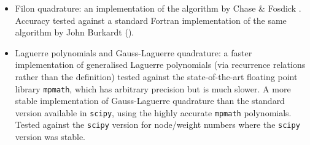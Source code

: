 \documentclass{article}
\newcommand{\1}{\mathbf{1}} %
\begin{document}
\begin{itemize}
  \item Filon quadrature: an implementation of the algorithm by Chase \& Fosdick
    \cite{chase1969algorithm}. Accuracy tested against a standard Fortran implementation
    of the same algorithm by John Burkardt (\cite{burkardt2014filon}).
  \item Laguerre polynomials and Gauss-Laguerre quadrature: a faster implementation
    of generalised Laguerre polynomials (via recurrence relations rather than the definition)
    tested against the state-of-the-art floating point library \texttt{mpmath}, which has
    arbitrary precision but is much slower.
    A more stable implementation of Gauss-Laguerre quadrature
    than the standard version available in \texttt{scipy}, 
    using the highly accurate \texttt{mpmath} polynomials. Tested against the \texttt{scipy}
    version for node/weight numbers where the \texttt{scipy} version was stable.
\end{itemize}

\clearpage
\printbibliography
\printindex
\end{document}
